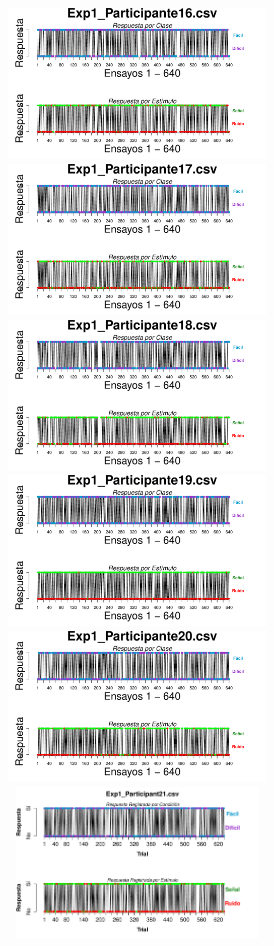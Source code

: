 \documentclass[a4paper ]{article}
\begin{document}
\begin{figure}[th]
\begin{center}
\includegraphics[width=8cm, height=4cm]{Figures/BiasResp_Exp1_P16} \includegraphics[width=8cm, height=4cm]{Figures/BiasResp_Exp1_P17} \includegraphics[width=8cm, height=4cm]{Figures/BiasResp_Exp1_P18}
\includegraphics[width=8cm, height=4cm]{Figures/BiasResp_Exp1_P19} \includegraphics[width=8cm, height=4cm]{Figures/BiasResp_Exp1_P20} \includegraphics[width=8cm, height=4cm]{Figures/BiasResp_Exp1_P21} 
\end{center}
\end{figure}
\clearpage
\end{document}
